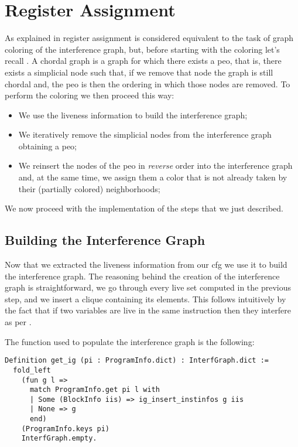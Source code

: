 \section{Register Assignment}
\label{sec:ra}

As explained in  register assignment is considered equivalent to the task of graph coloring of the interference graph, but, before starting with the coloring let's recall . A chordal graph is a graph for which there exists a \gls{peo}, that is, there exists a simplicial node such that, if we remove that node the graph is still chordal and, the \gls{peo} is then the ordering in which those nodes are removed.
To perform the coloring we then proceed this way:
\begin{itemize}
  \item We use the liveness information to build the interference graph;
  \item We iteratively remove the simplicial nodes from the interference graph obtaining a \gls{peo};
  \item We reinsert the nodes of the \gls{peo} in \textit{reverse} order into the interference graph and, at the same time, we assign them a color that is not already taken by their (partially colored) neighborhoods;
\end{itemize}

We now proceed with the implementation of the steps that we just described.

\subsection{Building the Interference Graph}

Now that we extracted the liveness information from our \gls{cfg} we use it to build the interference graph.
The reasoning behind the creation of the interference graph is straightforward, we go through every live set computed in the previous step, and we insert a clique containing its elements. This follows intuitively by the fact that if two variables are live in the same instruction then they interfere as per .

The function used to populate the interference graph is the following:

\begin{lstlisting}[style=Rocq]
Definition get_ig (pi : ProgramInfo.dict) : InterfGraph.dict :=
  fold_left
    (fun g l =>
      match ProgramInfo.get pi l with
      | Some (BlockInfo iis) => ig_insert_instinfos g iis
      | None => g
      end)
    (ProgramInfo.keys pi)
    InterfGraph.empty.
\end{lstlisting}

